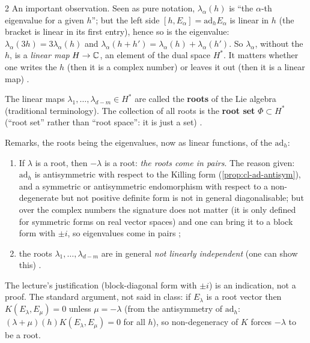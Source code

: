 \begin{paracol}{2}
An important observation. Seen as pure notation, $\lambda_\alpha(h)$ is ``the $\alpha$-th eigenvalue for a given $h$''; but the left side $[h,E_\alpha]=\mathrm{ad}_h E_\alpha$ is linear in $h$ (the bracket is linear in its first entry), hence so is the eigenvalue: $\lambda_\alpha(3h)=3\lambda_\alpha(h)$ and $\lambda_\alpha(h+h')=\lambda_\alpha(h)+\lambda_\alpha(h')$. So $\lambda_\alpha$, without the $h$, is a \emph{linear map} $H\to\mathbb{C}$, an element of the dual space $H^*$. It matters whether one writes the $h$ (then it is a complex number) or leaves it out (then it is a linear map)     .
\begin{definition}\label{def:cl-roots}
The linear maps $\lambda_1,\dots,\lambda_{d-m}\in H^*$ are called the \textbf{roots} of the Lie algebra (traditional terminology). The collection of all roots is the \textbf{root set} $\Phi\subset H^*$ (``root set'' rather than ``root space'': it is just a set)     .
\end{definition}
Remarks, the roots being the eigenvalues, now as linear functions, of the $\mathrm{ad}_h$:
\begin{enumerate}
  \item[(a)] If $\lambda$ is a root, then $-\lambda$ is a root: \emph{the roots come in pairs}. The reason given: $\mathrm{ad}_h$ is antisymmetric with respect to the Killing form (\cref{prop:cl-ad-antisym}), and a symmetric or antisymmetric endomorphism with respect to a non-degenerate but not positive definite form is not in general diagonalisable; but over the complex numbers the signature does not matter (it is only defined for symmetric forms on real vector spaces) and one can bring it to a block form with $\pm i$, so eigenvalues come in pairs        ;
  \item[(b)] the roots $\lambda_1,\dots,\lambda_{d-m}$ are in general \emph{not linearly independent} (one can show this) .
\end{enumerate}
\begin{coursenote}
The lecture's justification (block-diagonal form with $\pm i$) is an indication, not a proof. The standard argument, not said in class: if $E_\lambda$ is a root vector then $K(E_\lambda,E_\mu)=0$ unless $\mu=-\lambda$ (from the antisymmetry of $\mathrm{ad}_h$: $(\lambda+\mu)(h)K(E_\lambda,E_\mu)=0$ for all $h$), so non-degeneracy of $K$ forces $-\lambda$ to be a root. 
\end{coursenote}


\end{paracol}
